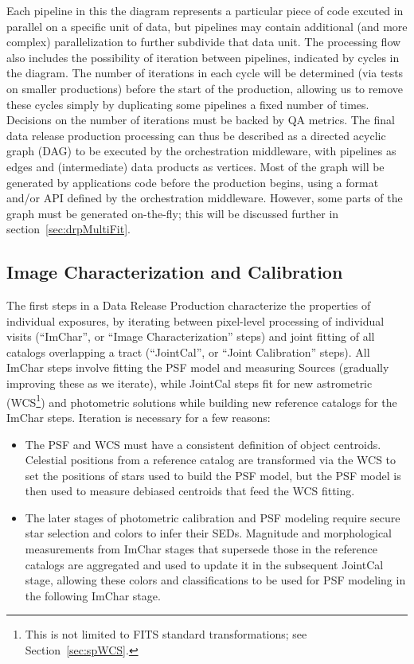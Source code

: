 Each pipeline in this the diagram represents a particular piece of code excuted in parallel on a specific unit of data, but pipelines may contain additional (and more complex) parallelization to further subdivide that data unit.  The processing flow also includes the possibility of iteration between pipelines, indicated by cycles in the diagram.  The number of iterations in each cycle will be determined (via tests on smaller productions) before the start of the production, allowing us to remove these cycles simply by duplicating some pipelines a fixed number of times.  Decisions on the number of iterations must be backed by QA metrics.  The final data release production processing can thus be described as a directed acyclic graph (DAG) to be executed by the orchestration middleware, with pipelines as edges and (intermediate) data products as vertices.  Most of the graph will be generated by applications code before the production begins, using a format and/or API defined by the orchestration middleware.  However, some parts of the graph must be generated on-the-fly; this will be discussed further in section~\ref{sec:drpMultiFit}.


\subsection{Image Characterization and Calibration}
\label{sec:drp_imchar_and_jointcal}

The first steps in a Data Release Production characterize the properties of individual exposures, by iterating between pixel-level processing of individual visits (``ImChar'', or ``Image Characterization'' steps) and joint fitting of all catalogs overlapping a tract (``JointCal'', or ``Joint Calibration'' steps).  All ImChar steps involve fitting the PSF model and measuring Sources (gradually improving these as we iterate), while JointCal steps fit for new astrometric (WCS\footnote{This is not limited to FITS standard transformations; see Section~\ref{sec:spWCS}.}) and photometric solutions while building new reference catalogs for the ImChar steps.  Iteration is necessary for a few reasons:
\begin{itemize}
\item The PSF and WCS must have a consistent definition of object centroids.  Celestial positions from a reference catalog are transformed via the WCS to set the positions of stars used to build the PSF model, but the PSF model is then used to measure debiased centroids that feed the WCS fitting.
\item The later stages of photometric calibration and PSF modeling require secure star selection and colors to infer their SEDs.  Magnitude and morphological measurements from ImChar stages that supersede those in the reference catalogs are aggregated and used to update it in the subsequent JointCal stage, allowing these colors and classifications to be used for PSF modeling in the following ImChar stage.
\end{itemize}

